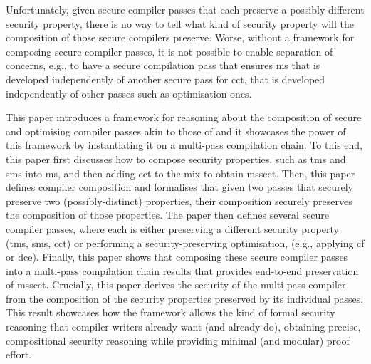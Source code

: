 \documentclass[utf8,acmsmall,review,screen,dvipsnames,anonymous]{acmart}
\begin{document}

Unfortunately, given secure compiler passes that each preserve a possibly-different security property, there is no way to tell what kind of security property will the composition of those secure compilers preserve.
Worse, without a framework for composing secure compiler passes, it is not possible to enable separation of concerns, e.g., to have a secure compilation pass that ensures \gls*{ms} that is developed independently of another secure pass for \gls*{cct}, that is developed independently of other passes such as optimisation ones.



This paper introduces a framework for reasoning about the composition of secure and optimising compiler passes akin to those of  and it showcases the power of this framework by instantiating it on a multi-pass compilation chain.
To this end, this paper first discusses how to compose security properties, such as \gls*{tms} and \gls*{sms} into \gls*{ms}, and then adding \gls*{cct} to the mix to obtain \gls*{msscct}.
Then, this paper defines compiler composition and formalises that given two passes that securely preserve two (possibly-distinct) properties, their composition securely preserves the composition of those properties.
The paper then defines several secure compiler passes, where each is either preserving a different security property (\gls*{tms}, \gls*{sms}, \gls*{cct}) or performing a security-preserving optimisation, (e.g., applying \gls*{cf} or \gls*{dce}).
Finally, this paper shows that composing these secure compiler passes into a multi-pass compilation chain results that provides end-to-end preservation of \gls*{msscct}.
Crucially, this paper derives the security of the multi-pass compiler from the composition of the security properties preserved by its individual passes.
This result showcases how the framework allows the kind of formal security reasoning that compiler writers already want (and already do), obtaining precise, compositional security reasoning while providing minimal (and modular) proof effort.
\end{document}
